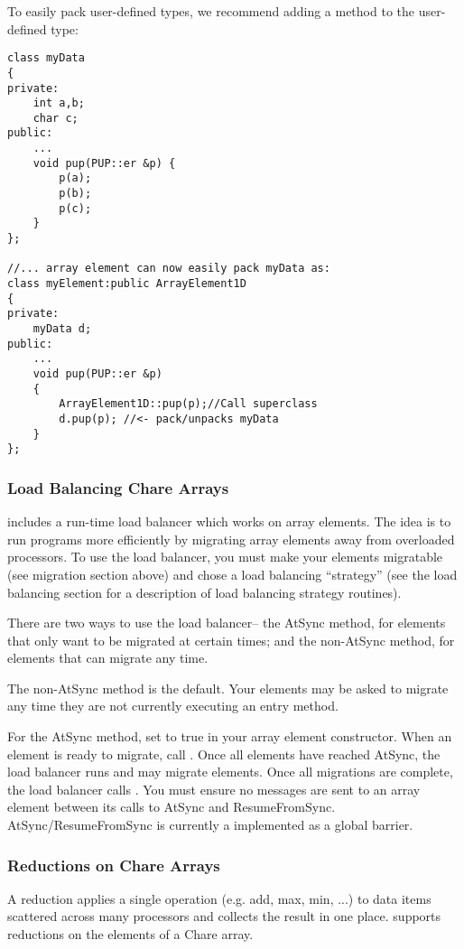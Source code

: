 To easily pack user-defined types, we recommend adding
a  method to the user-defined type:

\begin{verbatim}
class myData 
{
private:
    int a,b;
    char c;
public:
    ...
    void pup(PUP::er &p) {
        p(a);
        p(b);
        p(c);
    }
};

//... array element can now easily pack myData as:
class myElement:public ArrayElement1D 
{
private:
    myData d;
public:
    ...
    void pup(PUP::er &p)
    {
        ArrayElement1D::pup(p);//Call superclass
        d.pup(p); //<- pack/unpacks myData
    }
};
\end{verbatim}


\subsubsection{Load Balancing Chare Arrays}
\charmpp includes a run-time load balancer which works
on array elements.  The idea is to run programs more efficiently
by migrating array elements away from overloaded processors.
To use the load balancer, you must make your elements migratable
(see migration section above) and chose a load balancing 
``strategy'' (see the load balancing section for a description
of load balancing strategy routines).

There are two ways to use the load balancer-- the AtSync
method, for elements that only want to be migrated at certain
times; and the non-AtSync method, for elements that can migrate
any time.

The non-AtSync method is the default.  Your elements may be
asked to migrate any time they are not currently executing
an entry method.

For the AtSync method, set  to true in your 
array element constructor.  When an element is ready to migrate,
call .  Once all elements have reached AtSync, 
the load balancer runs and may migrate elements.  Once
all migrations are complete, the load balancer calls 
.  You must ensure no messages are
sent to an array element between its calls to AtSync and ResumeFromSync.
AtSync/ResumeFromSync is currently a implemented as a global barrier.



\subsubsection{Reductions on Chare Arrays}
A reduction applies a single operation (e.g. add, max, min, ...) to data items scattered across many processors and collects the result in one place.  \charmpp supports reductions on the elements of a Chare array.

